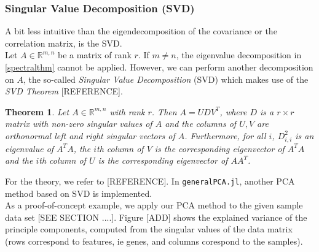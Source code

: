 \documentclass[journal, a4paper]{IEEEtran}
\newtheorem{theorem}{Theorem}[section]
\begin{document}
\hfill 
\subsubsection{Singular Value Decomposition (SVD)}\label{svd}


A bit less intuitive than the eigendecomposition of the covariance or the correlation matrix, is the SVD.\\
Let \( A \in \mathbb{R}^{m,n} \) be a matrix of rank \( r \). If \( m \neq n\), the eigenvalue decomposition in \ref{spectralthm} cannot be applied. However, we can perform another decomposition on \( A \), the so-called \textit{Singular Value Decomposition} (SVD) which makes use of the \textit{SVD Theorem} [REFERENCE].
\begin{theorem}\label{svdthm}
	Let \( A \in \mathbb{R}^{m,n} \) with rank \( r \). Then \( A = UDV^T\), where \( D \) is a \( r \times r \) matrix with non-zero singular values of \( A \) and the columns of \( U, V \) are orthonormal left and right singular vectors of \( A \). Furthermore, for all \( i \), \( D_{i,i}^{2} \) is an eigenvalue of \( A^T A\), the \( i \)th column of \( V \) is the corresponding eigenvector of \( A^T A\) and the \( i \)th column of \( U \) is the corresponding eigenvector of \( A A^T\).
\end{theorem}

% 
For the theory, we refer to [REFERENCE]. In \texttt{generalPCA.jl}, another PCA method based on SVD is implemented.\\

As a proof-of-concept example, we apply our PCA method to the given sample data set [SEE SECTION ....].
Figure [ADD] shows the explained variance of the principle components, computed from the singular values of the data matrix (rows correspond to features, ie genes, and columns corespond to the samples). 
\end{document}
